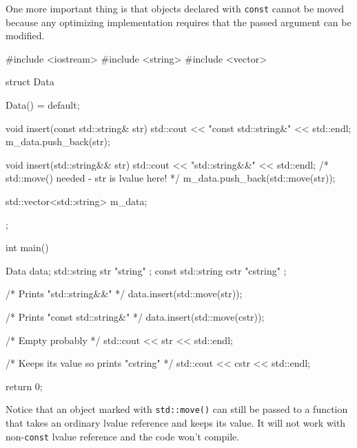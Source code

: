 \documentclass[../main]{subfiles}
\begin{document}
    One more important thing is that objects declared with \texttt{const} cannot be moved because any optimizing implementation requires that the passed argument
can be modified.
\begin{Code}
    #include <iostream>
    #include <string>
    #include <vector>
    
    struct Data
    {
        Data() = default;
    
        void insert(const std::string& str)
        {
            std::cout << "const std::string&" << std::endl;
            m_data.push_back(str);
        }
    
        void insert(std::string&& str)
        {
            std::cout << "std::string&&" << std::endl;
            /* std::move() needed - str is lvalue here! */
            m_data.push_back(std::move(str));
        }
    
        std::vector<std::string> m_data;
    };
    
    int main()
    {
        Data data;
        std::string str { "string" };
        const std::string cstr { "cstring" };

        /* Prints "std::string&&" */
        data.insert(std::move(str));

        /* Prints "const std::string&" */
        data.insert(std::move(cstr));

        /* Empty probably */
        std::cout << str << std::endl;

        /* Keeps its value so prints "cstring" */
        std::cout << cstr << std::endl;
    
        return 0;
    }
\end{Code}

    Notice that an object marked with \texttt{std::move()} can still be passed to a function that takes an ordinary lvalue reference
and keeps its value. It will not work with non-\texttt{const} lvalue reference and the code won't compile.
\end{document}
